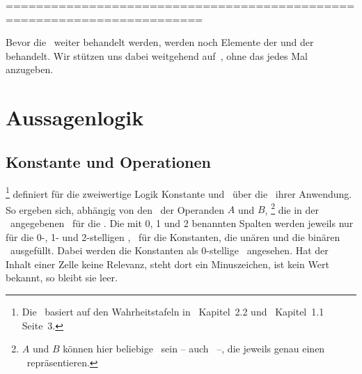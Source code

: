 ========================================================================

Bevor die \Schlussregel\ weiter behandelt werden, werden noch Elemente der \emph{\Aussagenlogik} und der \emph{\Praedikatenlogik} behandelt.
Wir stützen uns dabei weitgehend auf~\cite{bib:Rautenberg}, ohne das jedes Mal anzugeben.

\section{Aussagenlogik}%
\label{sec-Aussagenlogik}

\subsection{Konstante und Operationen}%
\label{sub-Operationen}

%
\footnote{%
	Die \tablename\ basiert auf den Wahrheitstafeln in~\cite{bib:Junktor} Kapitel~2.2 und~\cite{bib:Rautenberg} Kapitel~1.1 Seite~3.
}
definiert für die zweiwertige Logik Konstante und \Junktoren\ über die \Wahrheitswerte\ ihrer Anwendung.
So ergeben sich, abhängig von den \Wahrheitswerten\ der Operanden $A$ und $B$,%
\footnote{%
	$A$ und $B$ können hier beliebige \Aussagen\ sein -- auch \Formeln\ --, die jeweils genau einen \Wahrheitswert\ repräsentieren.
}
die in der \tablename\ angegebenen \Wahrheitswerte\ für die \Operationen.
Die mit 0, 1 und 2 benannten Spalten werden jeweils nur für die 0-, 1- und 2-stelligen \Junktoren, \textdh\ für die Konstanten, die unären und die binären \Junktoren\ ausgefüllt.
Dabei werden die Konstanten als 0-stellige \Junktoren\ angesehen.
Hat der Inhalt einer Zelle keine Relevanz, steht dort ein Minuszeichen, ist kein Wert bekannt, so bleibt sie leer.

